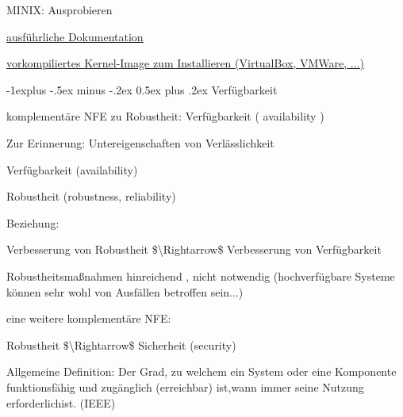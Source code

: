 \documentclass[a4paper]{article}
\makeatletter
\renewcommand{\subsection}{\@startsection{subsection}{2}{0mm}%
 {-1explus -.5ex minus -.2ex}%
 {0.5ex plus .2ex}%
 {\normalfont\normalsize\bfseries}}
\makeatother
\begin{document}
\begin{multicols}{3}
    MINIX: Ausprobieren

    \begin{itemize*}
        \item
        \href{https://wiki.minix3.org/doku.php?id=www:getting-started:start}{ausführliche
            Dokumentation}
        \item
        \href{https://wiki.minix3.org/doku.php?id=www:download:start}{vorkompiliertes
            Kernel-Image zum Installieren (VirtualBox, VMWare, ...)}
    \end{itemize*}


    \subsection{Verfügbarkeit}

    \begin{itemize*}
        \item
        komplementäre NFE zu Robustheit: Verfügbarkeit ( availability )
        \begin{itemize*}
            \item Zur Erinnerung: Untereigenschaften von Verlässlichkeit
        \end{itemize*}
        \begin{enumerate*}

            \item Verfügbarkeit (availability)
            \item Robustheit (robustness, reliability)
        \end{enumerate*}
        \item
        Beziehung:
        \begin{itemize*}
            \item Verbesserung von Robustheit \$\textbackslash Rightarrow\$ Verbesserung von Verfügbarkeit
            \item Robustheitsmaßnahmen hinreichend , nicht notwendig (hochverfügbare Systeme können sehr wohl von Ausfällen betroffen sein...)
        \end{itemize*}
        \item
        eine weitere komplementäre NFE:
        \begin{itemize*}
            \item Robustheit \$\textbackslash Rightarrow\$ Sicherheit (security)
        \end{itemize*}
    \end{itemize*}

    Allgemeine Definition: Der Grad, zu welchem ein System oder eine
    Komponente funktionsfähig und zugänglich (erreichbar) ist,wann immer
    seine Nutzung erforderlichist. (IEEE)


\end{multicols}
\end{document}
